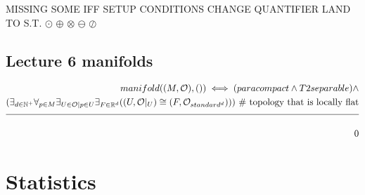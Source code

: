 \documentclass[a4paper]{article}
\newcommand{\eqComment}[1]{\text{  \# #1}}
\newcommand{\n}{\\[1.5ex] \hline \nonumber \\[0ex]}
\newcommand{\m}{\nonumber \\}
\begin{document}
MISSING SOME IFF SETUP CONDITIONS
CHANGE QUANTIFIER LAND TO S.T.
$\odot$ \quad $\oplus$ \quad $\otimes$ \quad $\ominus$ \quad $\oslash$

\subsection{Lecture 6 manifolds}
\begin{tcolorbox}
\begin{align}
   manifold((M, \mathcal{O}), ()) \iff (paracompact \land T2separable) \land
\m (\exists_{d \in \mathbb{N}^+} \forall_{p \in M} \exists_{U \in \mathcal{O}| p \in U} \exists_{F \in \mathbb{R}^d} ((U, \mathcal{O}|_U) \cong (F, \mathcal{O}_{standard^d}))) \eqComment{topology that is locally flat}
\n 0
\end {align}
\end{tcolorbox}

\section{Statistics}
\end{document}
